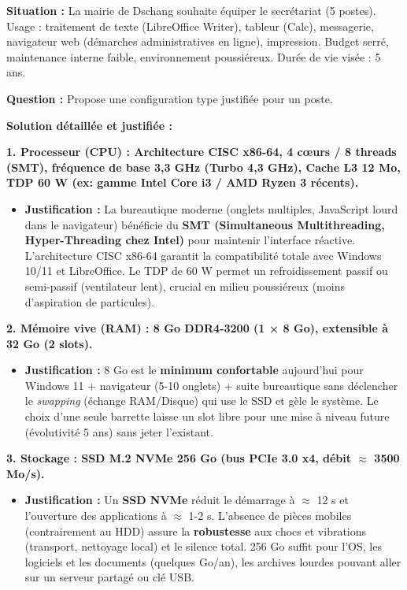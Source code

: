 \documentclass[11pt]{article}
\newcommand{\cle}[1]{{\popxbold\color{popdark}#1}}
\begin{document}
\begin{exoresolu}
\textbf{Situation :} La mairie de Dschang souhaite équiper le secrétariat (5 postes). Usage : traitement de texte (LibreOffice Writer), tableur (Calc), messagerie, navigateur web (démarches administratives en ligne), impression. Budget serré, maintenance interne faible, environnement poussiéreux. Durée de vie visée : 5 ans.

\textbf{Question :} Propose une configuration type justifiée pour un poste.

\tcblower

\textbf{Solution détaillée et justifiée :}

\textbf{1. Processeur (CPU) : Architecture CISC x86-64, 4 cœurs / 8 threads (SMT), fréquence de base 3,3 GHz (Turbo 4,3 GHz), Cache L3 12 Mo, TDP 60 W (ex: gamme Intel Core i3 / AMD Ryzen 3 récents).}
\begin{itemize}
    \item \textbf{Justification :} La bureautique moderne (onglets multiples, JavaScript lourd dans le navigateur) bénéficie du \textbf{SMT (Simultaneous Multithreading, Hyper-Threading chez Intel)} pour maintenir l'interface réactive. L'architecture \cle{CISC} x86-64 garantit la compatibilité totale avec Windows 10/11 et LibreOffice. Le TDP de 60 W permet un refroidissement passif ou semi-passif (ventilateur lent), crucial en milieu poussiéreux (moins d'aspiration de particules).
\end{itemize}

\textbf{2. Mémoire vive (RAM) : 8 Go DDR4-3200 (1 × 8 Go), extensible à 32 Go (2 slots).}
\begin{itemize}
    \item \textbf{Justification :} 8 Go est le \textbf{minimum confortable} aujourd'hui pour Windows 11 + navigateur (5-10 onglets) + suite bureautique sans déclencher le \emph{swapping} (échange RAM/Disque) qui use le SSD et gèle le système. Le choix d'une seule barrette laisse un slot libre pour une mise à niveau future (évolutivité 5 ans) sans jeter l'existant.
\end{itemize}

\textbf{3. Stockage : SSD M.2 NVMe 256 Go (bus PCIe 3.0 x4, débit $\approx$ 3500 Mo/s).}
\begin{itemize}
    \item \textbf{Justification :} Un \textbf{SSD NVMe} réduit le démarrage à $\approx$ 12 s et l'ouverture des applications à $\approx$ 1-2 s. L'absence de pièces mobiles (contrairement au HDD) assure la \textbf{robustesse} aux chocs et vibrations (transport, nettoyage local) et le silence total. 256 Go suffit pour l'OS, les logiciels et les documents (quelques Go/an), les archives lourdes pouvant aller sur un serveur partagé ou clé USB.
\end{itemize}


\end{exoresolu}
\end{document}
